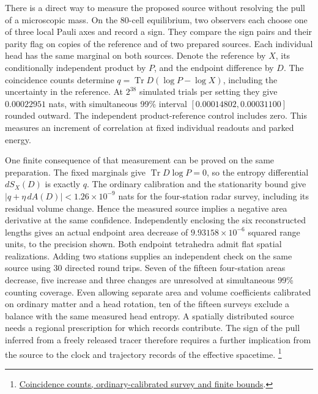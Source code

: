 \documentclass[11pt]{article}
\begin{document}
There is a direct way to measure the proposed source without resolving
the pull of a microscopic mass. On the 80-cell equilibrium, two
observers each choose one of three local Pauli axes and record a sign.
They compare the sign pairs and their parity flag on copies of the
reference and of two prepared sources. Each individual head has the same
marginal on both sources. Denote the reference by $X$, its conditionally
independent product by $P$, and the endpoint difference by $D$.
The coincidence counts determine $q=\operatorname{Tr}D(\log P-\log X)$,
including the uncertainty in the reference. At $2^{38}$ simulated
trials per setting they give $0.00022951$ nats, with simultaneous
99\% interval $[0.00014802,0.00031100]$ rounded outward. The independent
product-reference control includes zero. This measures an increment
of correlation at fixed individual readouts and parked energy.

One finite consequence of that measurement can be proved on the same
preparation. The fixed marginals give $\operatorname{Tr}D\log P=0$,
so the entropy differential $dS_X(D)$ is exactly $q$. The ordinary
calibration and the stationarity bound give
$|q+\eta\,dA(D)|<1.26\times10^{-9}$ nats for the four-station
radar survey, including its residual volume change. Hence the measured
source implies a negative area derivative at the same confidence.
Independently enclosing the six reconstructed lengths gives an actual
endpoint area decrease of $9.93158\times10^{-6}$ squared range units,
to the precision shown. Both endpoint tetrahedra admit flat spatial
realizations. Adding two stations supplies an independent check on the
same source using 30 directed round trips. Seven of the fifteen
four-station areas decrease, five increase and three changes are
unresolved at simultaneous 99\% counting coverage. Even allowing
separate area and volume coefficients calibrated on ordinary matter
and a head rotation, ten of the fifteen surveys exclude a balance with
the same measured head entropy. A spatially distributed source needs a
regional prescription for which records contribute. The sign of the
pull inferred from a freely released
tracer therefore requires a further implication from the source to
the clock and trajectory records of the effective spacetime.%
\footnote{\href{https://github.com/FloatingPragma/observer-patch-holography/tree/main/openwave/interval_echo/row_19/selected_collar}{Coincidence counts, ordinary-calibrated survey and finite bounds}.}
\end{document}
